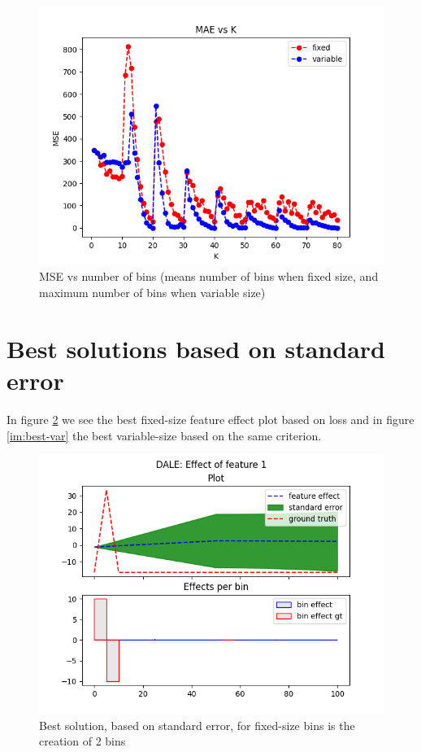 \documentclass{article}
\begin{document}
\begin{figure}[h]
\centering
\includegraphics[width=0.9\linewidth]{Figure_9.png}
\caption{MSE vs number of bins (means number of bins when fixed size, and maximum number of bins when variable size)}
\label{im:mse}
\end{figure}




\section{Best solutions based on standard error}

In figure \ref{im:best-fixed} we see the best fixed-size feature
effect plot based on loss and in figure \ref{im:best-var} the best variable-size based on the same criterion.

\begin{figure}[h]
\centering
\includegraphics[width=0.9\linewidth]{Figure_10.png}
\caption{Best solution, based on standard error, for fixed-size bins is the creation of 2 bins}
\label{im:best-fixed}
\end{figure}
\end{document}
